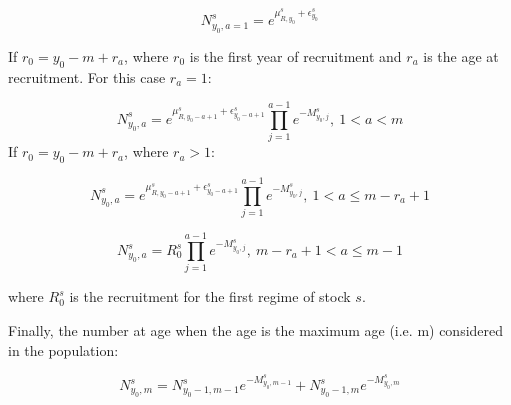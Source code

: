 \documentclass{article}
\begin{document}
\begin{equation}
N^s_{y_0,a=1}=e^{\mu^s_{R,y_0} + \epsilon^s_{y_0}}
\end{equation}

If $r_0 = y_0-m+r_a$, where $r_0$ is the first year of recruitment and $r_a$ is the age at recruitment. For this case $r_a=1$:

\begin{equation}
N^s_{y_0,a}=e^{\mu_{R,y_0-a+1}^s + \epsilon^s_{y_0-a+1}}
            \prod_{j=1}^{a-1}e^{-M^s_{y_0,j}}, \ 1<a<m
\end{equation}
If $r_0 = y_0-m+r_a$, where $r_a>1$:

\begin{equation}
N^s_{y_0,a}=e^{\mu_{R,y_0-a+1}^s + \epsilon^s_{y_0-a+1}}                          \prod_{j=1}^{a-1}e^{-M^s_{y_0,j}}, \ 1<a\leq m-r_a+1
\end{equation}

\begin{equation}
N^s_{y_0,a}=R_0^s\prod_{j=1}^{a-1}e^{-M^s_{y_0,j}}, \ m-r_a+1<a\leq m-1
\end{equation}

where $R_0^s$ is the recruitment for the first regime of stock $s$.

Finally, the number at age when the age is the maximum age (i.e. m) considered in the population:

\begin{equation}
N^s_{y_0,m}=N^s_{y_0-1,m-1}e^{-M^s_{y_0,m-1}}+N^s_{y_0-1,m}e^{-M^s_{y_0,m}}
\end{equation}

\hfill

\hfill


\end{document}
